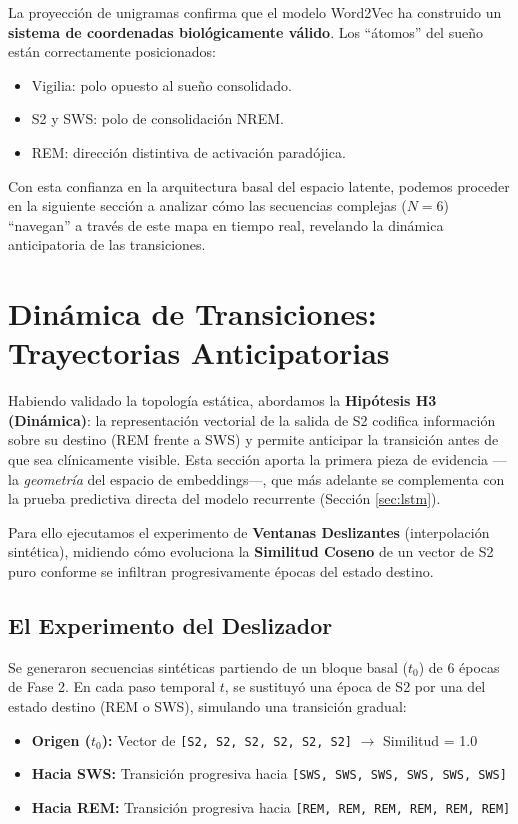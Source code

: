 La proyección de unigramas confirma que el modelo Word2Vec ha construido un \textbf{sistema de coordenadas biológicamente válido}. Los ``átomos'' del sueño están correctamente posicionados:
\begin{itemize}
    \item Vigilia: polo opuesto al sueño consolidado.
    \item S2 y SWS: polo de consolidación NREM.
    \item REM: dirección distintiva de activación paradójica.
\end{itemize}

Con esta confianza en la arquitectura basal del espacio latente, podemos proceder en la siguiente sección a analizar cómo las secuencias complejas ($N=6$) ``navegan'' a través de este mapa en tiempo real, revelando la dinámica anticipatoria de las transiciones.

\section{Dinámica de Transiciones: Trayectorias Anticipatorias}

Habiendo validado la topología estática, abordamos la \textbf{Hipótesis H3 (Dinámica)}: la representación vectorial de la salida de S2 codifica información sobre su destino (REM frente a SWS) y permite anticipar la transición antes de que sea clínicamente visible. Esta sección aporta la primera pieza de evidencia ---la \textit{geometría} del espacio de embeddings---, que más adelante se complementa con la prueba predictiva directa del modelo recurrente (Sección \ref{sec:lstm}).

Para ello ejecutamos el experimento de \textbf{Ventanas Deslizantes} (interpolación sintética), midiendo cómo evoluciona la \textbf{Similitud Coseno} de un vector de S2 puro conforme se infiltran progresivamente épocas del estado destino.

\subsection{El Experimento del Deslizador}

Se generaron secuencias sintéticas partiendo de un bloque basal ($t_0$) de 6 épocas de Fase 2. En cada paso temporal $t$, se sustituyó una época de S2 por una del estado destino (REM o SWS), simulando una transición gradual:

\begin{itemize}
    \item \textbf{Origen ($t_0$):} Vector de \texttt{[S2, S2, S2, S2, S2, S2]} $\rightarrow$ Similitud = 1.0
    \item \textbf{Hacia SWS:} Transición progresiva hacia \texttt{[SWS, SWS, SWS, SWS, SWS, SWS]}
    \item \textbf{Hacia REM:} Transición progresiva hacia \texttt{[REM, REM, REM, REM, REM, REM]}
\end{itemize}

